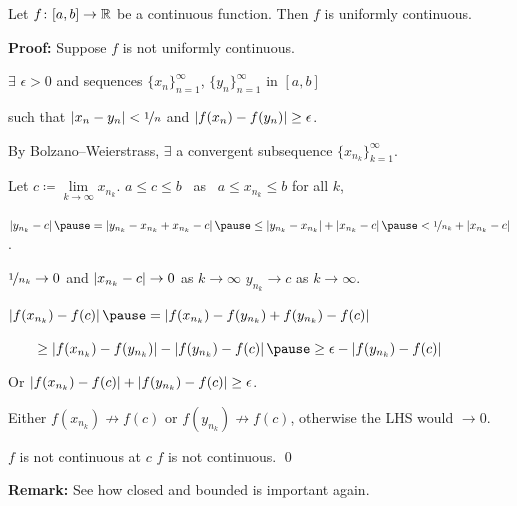 \documentclass[10pt,aspectratio=169]{beamer}
\begin{document}
\begin{frame}

\begin{theorem}
Let $f \colon [a,b] \to {\mathbb{R}}$ be a continuous function.  Then $f$
is uniformly continuous.
\end{theorem}

\pause
\textbf{Proof:}
Suppose $f$ is not uniformly continuous.

\pause
$\exists$ $\epsilon > 0$ and 
sequences
$\{ x_n \}_{n=1}^\infty$, $\{ y_n \}_{n=1}^\infty$ in $[a,b]$

such that
$\left\lvert {x_n-y_n} \right\rvert < \nicefrac{1}{n}$ and $\left\lvert {f(x_n)-f(y_n)} \right\rvert \geq
\epsilon$.

\pause
By Bolzano--Weierstrass,
$\exists$ a convergent subsequence $\{ x_{n_k} \}_{k=1}^\infty$.

\pause
Let $c \coloneqq \lim\limits_{k\to\infty} x_{n_k}$.
\pause
\quad
$a \leq c \leq b$~ as ~$a \leq x_{n_k} \leq b$ for all $k$,

\pause
\medskip

$
\abs{y_{n_k} - c}
\pause
=
\abs{y_{n_k} - x_{n_k} + x_{n_k} - c}
\pause
\leq
\abs{y_{n_k} - x_{n_k}}
+
\abs{x_{n_k}-c}
\pause
<
\nicefrac{1}{n_k} 
+
\abs{x_{n_k}-c}$.

\pause
\medskip

$\nicefrac{1}{n_k} \to 0$ and $\left\lvert {x_{n_k}-c} \right\rvert \to 0$ as $k \to \infty$
\pause
\wthus $y_{n_k} \to c$ as $k \to \infty$.

\pause
\medskip

$\abs{f(x_{n_k}) - f(c)}
\pause
=
\abs{f(x_{n_k}) - f(y_{n_k}) + f(y_{n_k}) - f(c)}$

\pause
\medskip

$\qquad \geq
\abs{f(x_{n_k}) - f(y_{n_k})} - \abs{f(y_{n_k}) - f(c)}
\pause
\geq
\epsilon - \abs{f(y_{n_k})-f(c)}$

\pause
\medskip

Or \qquad
$\left\lvert {f(x_{n_k})-f(c)} \right\rvert 
+
\left\lvert {f(y_{n_k})-f(c)} \right\rvert
\geq
\epsilon$.

\pause
\medskip

Either $f(x_{n_k}) \not\to f(c)$ or
$f(y_{n_k}) \not\to f(c)$, otherwise the LHS would $\to 0$.

\pause
\medskip

\thus \quad $f$ is not continuous at $c$
\pause
\wthus $f$ is not continuous.
\qed

\pause
\medskip

\textbf{Remark:} See how closed and bounded is important again.

\end{frame}
\end{document}
